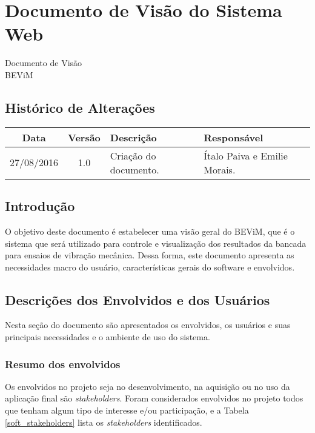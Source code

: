 \chapter{Documento de Visão do Sistema Web}
% 	


\begin{center}
 {\large Documento de Visão}\\[0.2cm]
 {BEViM}\\
 \end{center}
 
 \section*{Histórico de Alterações}
\begin{table}[h]
\centering
\begin{tabular}{|c|c|p{6cm}|p{5cm}|}
\hline
Data & Versão & Descrição & Responsável\\
\hline                               
27/08/2016 & 1.0 & Criação do documento. & Ítalo Paiva e Emilie Morais.\\
\hline
\end{tabular}
\end{table}

\section*{Introdução}
	
    O objetivo deste documento é estabelecer uma visão geral do BEViM, que é o sistema que será utilizado para controle e visualização dos resultados da bancada para ensaios de vibração mecânica. Dessa forma, este documento apresenta as necessidades macro do usuário, características gerais do software e envolvidos.
    
   
\section*{Descrições dos Envolvidos e dos Usuários}
	
    Nesta seção do documento são apresentados os envolvidos, os usuários e suas principais necessidades e o ambiente de uso do sistema.
    \subsection*{Resumo dos envolvidos}
		
        Os envolvidos no projeto seja no desenvolvimento, na aquisição ou no uso da aplicação final são \textit{stakeholders}. Foram considerados envolvidos no projeto todos que tenham algum tipo de interesse e/ou participação, e a Tabela \ref{soft_stakeholders} lista os \textit{stakeholders} identificados.

